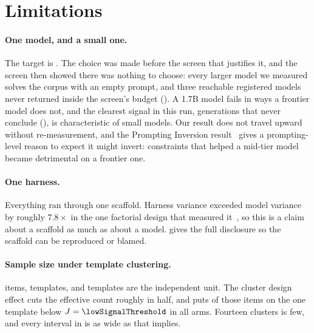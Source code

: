 \section{Limitations}
\label{sec:limitations}


\paragraph{One model, and a small one.} The target is \NUM{\studyModel}. The
choice was made before the screen that justifies it, and the screen then
showed there was nothing to choose: every larger model we measured solves the
corpus with an empty prompt, and three reachable registered models never
returned inside the screen's budget (). A 1.7B model fails in ways a
frontier model does not, and the clearest signal in this run, generations
that never conclude (), is characteristic of small
models. Our result does not travel upward without re-measurement, and the
Prompting Inversion result~\citep{promptinginversion2025} gives a
prompting-level reason to expect it might invert: constraints that helped a
mid-tier model became detrimental on a frontier one.

\paragraph{One harness.} Everything ran through one scaffold. Harness variance
exceeded model variance by roughly $7.8\times$ in the one factorial design
that measured it~\citep{harnessdisclosure2026}, so this is a claim about a
scaffold as much as about a model.  gives the full
disclosure so the scaffold can be reproduced or blamed.

\paragraph{Sample size under template clustering.} \NUM{\totalItems} items,
\NUM{\studyTemplates} templates, and templates are the independent unit. The
cluster design effect cuts the effective count roughly in half, and
 puts \NUM{\lowSignalItems} of those items on the one template
below $J = \NUM{\lowSignalThreshold}$ in all arms. Fourteen clusters is few, and
every interval in  is as wide as that implies.

